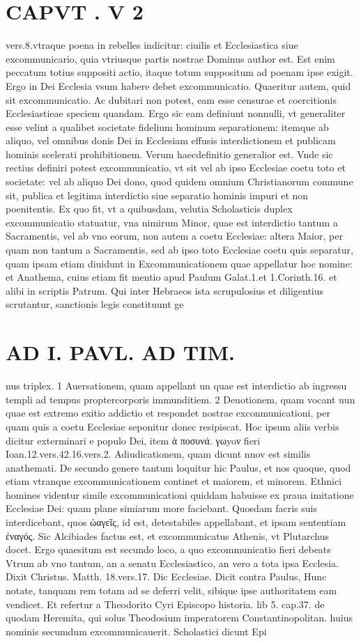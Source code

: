 \documentclass{article}
\begin{document}
\begin{pages}
\section*{CAPVT . V 2 }\pstart vers.8.vtraque poena in rebelles indicitur: ciuilis et Ecclesiastica siue excommunicario, quia vtriusque partis nostrae Dominus author est. Est enim peccatum totius suppositi actio, itaque totum suppositum ad poenam ipse exigit. Ergo in Dei Ecclesia vsum habere debet excommunicatio. Quaeritur autem, quid sit excommunicatio. Ac dubitari non potest, eam esse censurae et coercitionis Ecclesiastieae speciem quandam. Ergo sic eam definiunt nonnulli, vt generaliter esse velint a qualibet societate fidelium hominum separationem: itemque ab aliquo, vel omnibus donis Dei in Ecclesiam effusis interdictionem et publicam hominis scelerati prohibitionem. Verum haecdefinitio generalior est. Vnde sic rectius definiri potest excommunicatio, vt sit vel ab ipso Ecclesiae coetu toto et societate: vel ab aliquo Dei dono, quod quidem omnium Christianorum commune sit, publica et legitima interdictio siue separatio hominis impuri et non poenitentis. Ex quo fit, vt a quibusdam, velutia Scholasticis duplex excommunicatio statuatur, vna nimirum Minor, quae est interdictio tantum a Sacramentis, vel ab vno eorum, non autem a coetu Ecclesiae: altera Maior, per quam non tantum a Sacramentis, sed ab ipso toto Ecclesiae coetu quis separatur, quam ipsam etiam diuidunt in Excommunicationem quae appellatur hoc nomine: et Anathema, cuius etiam fit mentio apud Paulum Galat.1.et 1.Corinth.16. et alibi in scriptis Patrum. Qui inter Hebraeos ista scrupulosius et diligentius scrutantur, sanctionis legis constituunt ge\pend
\section*{AD I. PAVL. AD TIM. }
\marginpar{[ p.332 ]}\pstart nus triplex. 1 Auersationem, quam appellant un quae est interdictio ab ingressu templi ad tempus proptercorporis immunditiem. 2 Deuotionem, quam vocant uun quae est extremo exitio addictio et respondet nostrae exconmunicationi, per quam quis a coetu Ecclesiae seponitur donec resipiscat. Hoc ipsum aliis verbis dicitur exterminari e populo Dei, item ἀ ποσυνά. γωyoν fieri Ioan.12.vers.42.16.vers.2. Adiudicationem, quam dicunt nnov est similis anathemati. De secundo genere tantum loquitur hic Paulus, et nos quoque, quod etiam vtranque excommunicationem continet et maiorem, et minorem. Ethnici homines videntur simile excommunicationi quiddam habuisse ex praua imitatione Ecclesiae Dei: quam plane simiarum more faciebant. Quosdam facris suis interdicebant, quos ὠαγεῖς, id est, detestabiles appellabant, et ipsam sententiam ἐναγός. Sic Alcibiades factus est, et excommunicatus Athenis, vt Plutarchus docet. Ergo quaesitum est secundo loco, a quo excommunicatio fieri debeats Vtrum ab vno tantum, an a senatu Ecclesiastico, an vero a tota ipsa Ecclesia. Dixit Christus. Matth. 18.vers.17. Dic Ecclesiae. Dicit contra Paulus, Hunc notate, tanquam rem totam ad se deferri velit, sibique ipse authoritatem eam vendicet. Et refertur a Theodorito Cyri Episcopo historia. lib 5. cap.37. de quodam Heremita, qui solus Theodosium imperatorem Constantinopolitan. huius nominis secumdum excommunicauerit. Scholastici dicunt Epi\pend

\end{pages}
\end{document}
